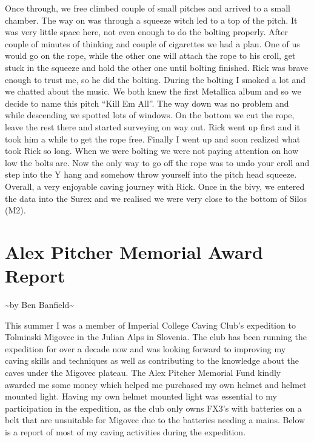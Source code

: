 Once through, we free climbed couple of small pitches and arrived to a
small chamber. The way on was through a squeeze witch led to a top of
the pitch. It was very little space here, not even enough to do the
bolting properly. After couple of minutes of thinking and couple of
cigarettes we had a plan. One of us would go on the rope, while the
other one will attach the rope to his croll, get stuck in the squeeze
and hold the other one until bolting finished. Rick was brave enough to
trust me, so he did the bolting. During the bolting I smoked a lot and
we chatted about the music. We both knew the first Metallica album and
so we decide to name this pitch ``Kill Em All''. The way down was no
problem and while descending we spotted lots of windows. On the bottom
we cut the rope, leave the rest there and started surveying on way out.
Rick went up first and it took him a while to get the rope free. Finally
I went up and soon realized what took Rick so long. When we were bolting
we were not paying attention on how low the bolts are. Now the only way
to go off the rope was to undo your croll and step into the Y hang and
somehow throw yourself into the pitch head squeeze. Overall, a very
enjoyable caving journey with Rick. Once in the bivy, we entered the
data into the Surex and we realised we were very close to the bottom of
Silos (M2).


\section{Alex Pitcher Memorial Award
Report}\label{alex-pitcher-memorial-award-report}

\textasciitilde{}by Ben Banfield\textasciitilde{}

This summer I was a member of Imperial College Caving Club's expedition
to Tolminski Migovec in the Julian Alps in Slovenia. The club has been
running the expedition for over a decade now and was looking forward to
improving my caving skills and techniques as well as contributing to the
knowledge about the caves under the Migovec plateau. The Alex Pitcher
Memorial Fund kindly awarded me some money which helped me purchased my
own helmet and helmet mounted light. Having my own helmet mounted light
was essential to my participation in the expedition, as the club only
owns FX3's with batteries on a belt that are unsuitable for Migovec due
to the batteries needing a mains. Below is a report of most of my caving
activities during the expedition.

